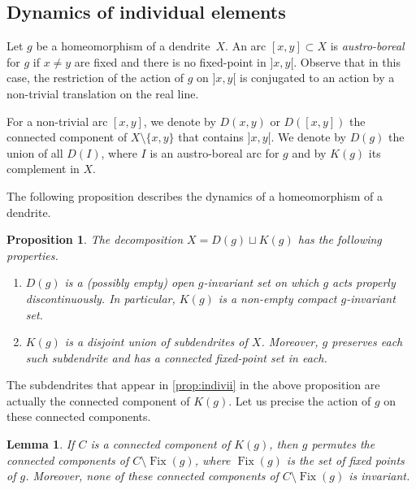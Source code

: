 \documentclass[JEP,XML,SOM,Unicode,NoFloatCountersInSection]{cedram}
\newenvironment{enumeratei}
{\bgroup\def\theenumi{\roman{enumi}}\def\theenumii{\arabic{enumii}}\begin{enumerate}}
{\end{enumerate}\egroup}
\theoremstyle{plain}
\newtheorem{lem}[thm]{Lemma}
\newtheorem{prop}[thm]{Proposition}
\theoremstyle{definition}
\DeclareMathOperator{\Fix}{Fix}
\begin{document}
\subsection{Dynamics of individual elements}

Let $g$ be a homeomorphism of a dendrite~$X$. An arc $[x,y]\subset X$ is \emph{austro-boreal} for $g$ if $x\neq y$ are fixed and there is no fixed-point in $]x,y[$. Observe that in this case, the restriction of the action of $g$ on $]x,y[$ is conjugated to an action by a non-trivial translation on the real line.

For a non-trivial arc $[x,y]$, we denote by $D(x,y)$ or $D([x,y])$ the connected component of $X\setminus\{x,y\}$ that contains $]x,y[$. We denote by $D(g)$ the union of all $D(I)$, where $I$ is an austro-boreal arc for $g$ and by $K(g)$ its complement in $X$.

The following proposition \cite[Prop.\,10.6]{DM_dendrites} describes the dynamics of a homeomorphism of a dendrite.

\begin{prop}\label{prop:indiv}
The decomposition $X=D(g) \sqcup K(g)$ has the following properties.
\begin{enumeratei}
\item\label{prop:indivi} $D(g)$ is a (possibly empty) open $g$-invariant set on which $g$ acts properly discontinuously. In particular, $K(g)$ is a non-empty compact $g$-invariant set.\label{pt:tectonic:dec}

\item\label{prop:indivii} $K(g)$ is a disjoint union of subdendrites of $X$. Moreover, $g$ preserves each such subdendrite and has a connected fixed-point set in each.\label{pt:tectonic:K}
\end{enumeratei}
\end{prop}

The subdendrites that appear in \eqref{prop:indivii} in the above proposition are actually the connected component of $K(g)$. Let us precise the action of $g$ on these connected components.

\begin{lem}\label{rem:kg}If $C$ is a connected component of $K(g)$, then $g$ permutes the connected components of $C\setminus\Fix(g)$, where $\Fix(g)$ is the set of fixed points of $g$. Moreover, none of these connected components of $C\setminus\Fix(g)$ is invariant.
\end{lem}
\end{document}

